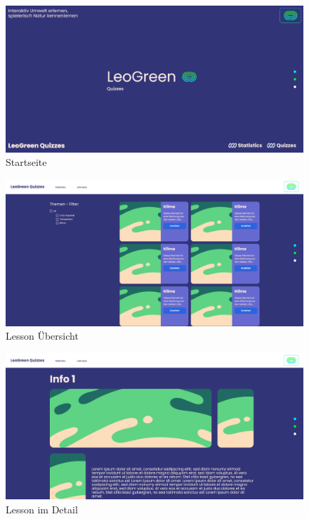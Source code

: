 


\begin{figure}
    \centering
    \includegraphics[scale=0.3]{pics/image.png}
    \caption{Startseite}
    \label{fig:impl:img1}
\end{figure}
\begin{figure}
    \centering
    \includegraphics[scale=0.3]{pics/image (1).png}
    \caption{Lesson Übersicht}
    \label{fig:impl:img2}
\end{figure}
\begin{figure}
    \centering
    \includegraphics[scale=0.3]{pics/image (2).png}
    \caption{Lesson im Detail}
    \label{fig:impl:img3}
\end{figure}
